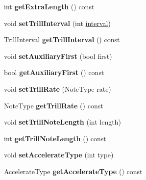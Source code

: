 \begin{DoxyCompactItemize}
int {\bfseries get\+Extra\+Length} () const
\item 
\mbox{\label{class_o_v_e_1_1_articulation_a9efa8713b10c0ff7baf3a15d9be08f4f}} 
void {\bfseries set\+Trill\+Interval} (int \hyperlink{class_interval}{interval})
\item 
\mbox{\label{class_o_v_e_1_1_articulation_a9138f96e0abc4206ceaacef6738dfa22}} 
Trill\+Interval {\bfseries get\+Trill\+Interval} () const
\item 
\mbox{\label{class_o_v_e_1_1_articulation_a30ccdc77df440f86e1a825a8a60db9ee}} 
void {\bfseries set\+Auxiliary\+First} (bool first)
\item 
\mbox{\label{class_o_v_e_1_1_articulation_a83d5ddba9031f795296add4c917b96c8}} 
bool {\bfseries get\+Auxiliary\+First} () const
\item 
\mbox{\label{class_o_v_e_1_1_articulation_a0a2f16c79095e03d91755788b04a9fe5}} 
void {\bfseries set\+Trill\+Rate} (Note\+Type rate)
\item 
\mbox{\label{class_o_v_e_1_1_articulation_ae209c8bf42535e515e7c93e1b8995888}} 
Note\+Type {\bfseries get\+Trill\+Rate} () const
\item 
\mbox{\label{class_o_v_e_1_1_articulation_a8405630ace87e54e17ca5b2f5b51e33a}} 
void {\bfseries set\+Trill\+Note\+Length} (int length)
\item 
\mbox{\label{class_o_v_e_1_1_articulation_a6dbf30e477fefab8eb5651ca009ced46}} 
int {\bfseries get\+Trill\+Note\+Length} () const
\item 
\mbox{\label{class_o_v_e_1_1_articulation_a12d3484bc6236aed77f88d778ad7e070}} 
void {\bfseries set\+Accelerate\+Type} (int type)
\item 
\mbox{\label{class_o_v_e_1_1_articulation_aadca9b32d5e9873a6eeccaa562dbcf40}} 
Accelerate\+Type {\bfseries get\+Accelerate\+Type} () const
\end{DoxyCompactItemize}
